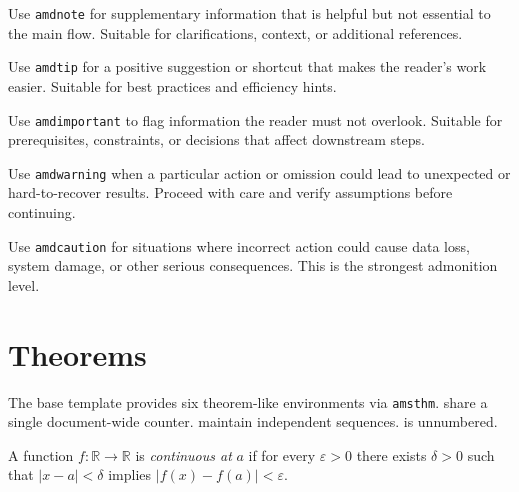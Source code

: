 \lipsum[1]

\begin{amdnote}
    Use \texttt{amdnote} for supplementary information that is helpful
    but not essential to the main flow. Suitable for clarifications,
    context, or additional references.
\end{amdnote}

\lipsum[1]

\begin{amdtip}
    Use \texttt{amdtip} for a positive suggestion or shortcut that
    makes the reader's work easier. Suitable for best practices
    and efficiency hints.
\end{amdtip}

\lipsum[1]

\begin{amdimportant}
    Use \texttt{amdimportant} to flag information the reader must not
    overlook. Suitable for prerequisites, constraints, or decisions
    that affect downstream steps.
\end{amdimportant}

\lipsum[1]

\begin{amdwarning}
    Use \texttt{amdwarning} when a particular action or omission could
    lead to unexpected or hard-to-recover results. Proceed with care
    and verify assumptions before continuing.
\end{amdwarning}

\lipsum[1]

\begin{amdcaution}
    Use \texttt{amdcaution} for situations where incorrect action could
    cause data loss, system damage, or other serious consequences.
    This is the strongest admonition level.
\end{amdcaution}

\lipsum[1]

\section{Theorems} \label{sec:theorems}

The base template provides six theorem-like environments via
\texttt{amsthm}. 
share a single document-wide counter. 
maintain independent sequences.  is unnumbered.

\lipsum[1]

\begin{definition}
    \label{def:continuity}
    A function $f : \mathbb{R} \to \mathbb{R}$ is \emph{continuous at} $a$
    if for every $\varepsilon > 0$ there exists $\delta > 0$ such that
    $|x - a| < \delta$ implies $|f(x) - f(a)| < \varepsilon$.
\end{definition}

